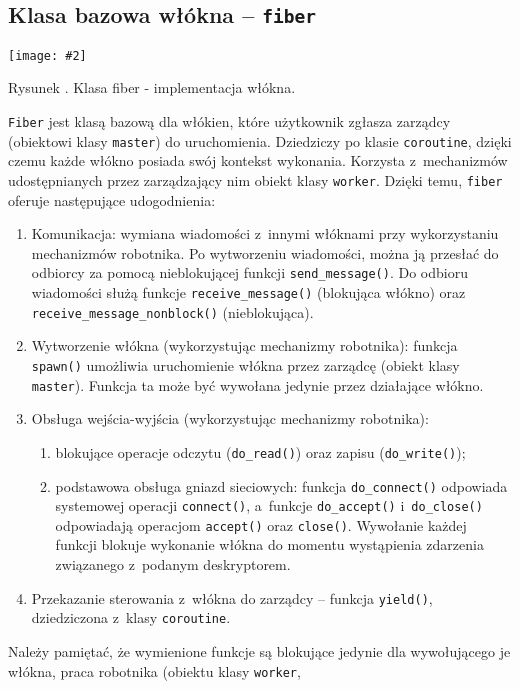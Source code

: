\documentclass[12pt]{mwart}
\newcommand{\code}{\texttt}
\newcommand{\procbr}{()}
\newcommand{\function}[1]{\code{#1\procbr}}
\newcounter{figmain}
\newcommand{\myownfigure}[4]{ \newcounter{#1} \setcounter{#1}{\value{figmain}} \addtocounter{figmain}{1} \begin{center} \label{fig:#1} \centering \texttt{[image: \#2]}\\ \nopagebreak[5] \parbox[t]{11.5cm}{Rysunek \arabic{#1}. #3.} \end{center}}
\begin{document}
\subsection{Klasa bazowa włókna -- \code{fiber}}
\label{sec:fibersClass}
    \myownfigure{Fiber}{Fiber.png}{Klasa fiber - implementacja włókna}{.7}
%
\indent
  \code{Fiber} jest klasą bazową dla włókien, które użytkownik zgłasza zarządcy (obiektowi klasy \code{master}) do uruchomienia. Dziedziczy po klasie \code{coroutine},
  dzięki czemu każde włókno posiada swój kontekst wykonania. Korzysta z~mechanizmów udostępnianych przez zarządzający nim obiekt klasy \code{worker}.
  Dzięki temu, \code{fiber} oferuje następujące udogodnienia:
  \begin{enumerate}
    \item Komunikacja: wymiana wiadomości z~innymi włóknami przy wykorzystaniu mechanizmów robotnika. 
      Po wytworzeniu wiadomości, można ją przesłać do odbiorcy za pomocą nieblokującej funkcji \function{send\_message}.
      Do odbioru wiadomości służą funkcje \function{receive\_message} (blokująca włókno) oraz \function{receive\_message\_nonblock} (nieblokująca).
    \item Wytworzenie włókna (wykorzystując mechanizmy robotnika): 
    \linebreak funkcja \function{spawn} umożliwia uruchomienie włókna przez zarządcę (obiekt klasy \code{master}).
      Funkcja ta może być wywołana jedynie przez działające włókno.
    \item Obsługa wejścia-wyjścia (wykorzystując mechanizmy robotnika):
      \begin{enumerate}
        \item blokujące operacje odczytu (\function{do\_read}) oraz zapisu (\function{do\_write});
        \item podstawowa obsługa gniazd sieciowych: funkcja \function{do\_connect} odpowiada systemowej operacji \function{connect}, a~funkcje \function{do\_accept} 
          \linebreak i~\function{do\_close} odpowiadają operacjom \function{accept} oraz \function{close}. Wywołanie każdej funkcji blokuje wykonanie włókna do momentu wystąpienia  
          zdarzenia związanego z~podanym deskryptorem.
      \end{enumerate}
    \item Przekazanie sterowania z~włókna do zarządcy -- funkcja \function{yield}, dziedziczona z~klasy \code{coroutine}.
  \end{enumerate}
  Należy pamiętać, że wymienione funkcje są blokujące jedynie dla wywołującego je włókna, praca robotnika (obiektu klasy \code{worker}, 
\end{document}
